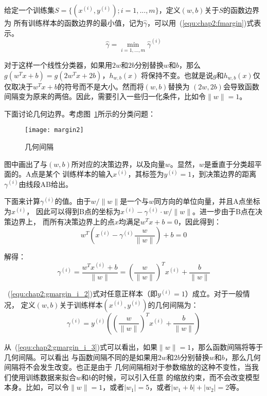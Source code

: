 给定一个训练集$S = \{(x^{(i)},y^{(i)});i = 1, ..., m\}$，定义$(w,b)$关于$S$的函数边界为
所有训练样本的函数边界的最小值，记为$\hat{\gamma}$，可以用~(\ref{equ:chap2:fmargin})式表示。
\begin{equation}
  \label{equ:chap2:fmargin}
  \hat{\gamma} = \min_{i=1,...,m}\hat{\gamma}^{(i)}
\end{equation}

对于这样一个线性分类器，如果用$2w$和$2b$分别替换$w$和$b$，那么$g(w^Tx+b)=g(2w^Tx+2b)$，$h_{w,b}(x)$
将保持不变。也就是说$g$和$h_{w,b}(x)$仅仅取决于$w^Tx+b$的符号而不是大小。然而将$(w,b)$替换为
$(2w,2b)$会导致函数间隔变为原来的两倍。因此，需要引入一些归一化条件，比如令$\|w\|=1$。

下面讨论几何边界。考虑图~\ref{fig:margin2}所示的分类问题：
\begin{figure}[ht] %
  \centering
  \texttt{[image: margin2]}
  \caption{几何间隔}
  \label{fig:margin2}
\end{figure}

图中画出了与$(w,b)$所对应的决策边界，以及向量$w$。显然，$w$是垂直于分类超平面的。A点是某个
训练样本的输入$x^{(i)}$，其标签为$y^{(i)} = 1$，到决策边界的距离$\gamma^{(i)}$由线段AB给出。

下面来计算$\gamma^{(i)}$的值。由于$w/\|w\|$是一个与$w$同方向的单位向量，并且A点坐标为$x^{(i)}$，
因此可以得到B点的坐标为$x^{(i)} - \gamma^{(i)} \cdot w/\|w\|$。进一步由于B点在决策边界上，
而所有决策边界上的点$x$均满足$w^Tx+b=0$，因此得到：
\begin{equation}
  \label{equ:chap2:gmargin_i_1}
  w^T\left(x^{(i)} - \gamma^{(i)}\frac{w}{\|w\|}\right) + b = 0
\end{equation}

解得：
\begin{equation}
  \label{equ:chap2:gmargin_i_2}
  \gamma^{(i)} = \frac{w^Tx^{(i)}+b}{\|w\|} = \left(\frac{w}{\|w\|}\right)^Tx^{(i)} + \frac{b}{\|w\|}
\end{equation}

~(\ref{equ:chap2:gmargin_i_2})式对任意正样本（即$y^{(i)} = 1$）成立。对于一般情况，
定义$(w,b)$关于训练样本$(x^{(i)}, y^{(i)})$的几何间隔为：
\begin{equation}
  \label{equ:chap2:gmargin_i_3}
  \gamma^{(i)} = y^{(i)}\left(\left(\frac{w}{\|w\|}\right)^Tx^{(i)} + \frac{b}{\|w\|}\right)
\end{equation}

从~(\ref{equ:chap2:gmargin_i_3})式可以看出，如果$\|w\|=1$，那么函数间隔将等于几何间隔。可以看出
与函数间隔不同的是如果用$2w$和$2b$分别替换$w$和$b$，那么几何间隔将不会发生改变。也正是由于
几何间隔相对于参数缩放的这种不变性，当我们使用训练数据来拟合$w$和$b$的时候，可以引入任意
的缩放约束，而不会改变模型本身。比如，可以令$\|w\|=1$，或者$|w_1|=5$，或者$|w_1+b|+|w_2|=2$等。

